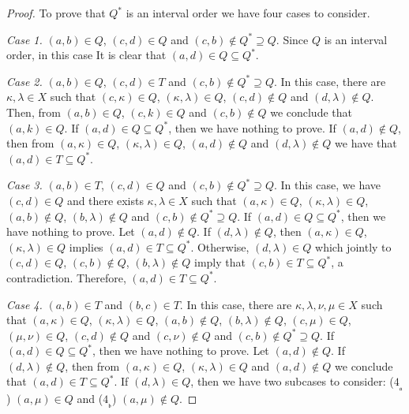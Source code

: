 \documentclass{article}
\theoremstyle{definition}
\begin{document}
\begin{proof}
To prove that $Q^{\ast}$ is an interval order we have four cases to consider.
\par\smallskip\par\noindent
{\it Case 1.} $(a,b)\in Q$, $(c,d)\in Q$ and $(c,b)\notin Q^{\ast}\supseteq Q$.
Since $Q$ is an interval order, in this case It is clear that $(a,d)\in Q\subseteq Q^{\ast}$.
\par\smallskip\par\noindent
{\it Case 2.} $(a,b)\in Q$, $(c,d)\in T$ and $(c,b)\notin Q^{\ast}\supseteq Q$.
In this case, there are $\kappa, \lambda\in X$ such that
$(c,\kappa)\in Q$, $(\kappa,\lambda)\in Q$, $(c,d)\notin Q$ and $(d,\lambda)\notin Q$.
Then, from $(a,b)\in Q$, $(c,k)\in Q$ and $(c,b)\notin Q$ we conclude that $(a,k)\in Q$.
If $(a,d)\in Q\subseteq Q^{\ast}$, then we have nothing to prove. If $(a,d)\notin Q$, then from 
$(a,\kappa)\in Q$, $(\kappa,\lambda)\in Q$, $(a,d)\notin Q$ and $(d,\lambda)\notin Q$ we have that $(a,d)\in T\subseteq Q^{\ast}$.
\par\smallskip\par\noindent
{\it Case 3.} $(a,b)\in T$, $(c,d)\in Q$ and $(c,b)\notin Q^{\ast}\supseteq Q$.
In this case,
we have $(c,d)\in Q$ and 
there exists
$\kappa, \lambda \in X$ such that 
$(a,\kappa)\in Q$, $(\kappa,\lambda)\in Q$, $(a,b)\notin Q$, $(b,\lambda)\notin Q$
and  $(c,b)\notin Q^{\ast}\supseteq Q$.
If $(a,d)\in Q\subseteq Q^{\ast}$, then we have nothing to prove.
Let $(a,d)\notin Q$. If $(d,\lambda)\notin Q$, then 
$(a,\kappa)\in Q$, $(\kappa,\lambda)\in Q$ implies $(a,d)\in T\subseteq Q^{\ast}$.
Otherwise, $(d,\lambda)\in Q$ which jointly to $(c,d)\in Q$, $(c,b)\notin Q$, $(b,\lambda)\notin Q$ imply that $(c,b)\in T\subseteq Q^{\ast}$, a contradiction. Therefore, 
$(a,d)\in T\subseteq Q^{\ast}$.
\par\smallskip\par\noindent
{\it Case 4.} $(a,b)\in T$ and $(b,c)\in T$. In this case, there are $\kappa, \lambda, \nu, \mu\in X$
such that 
$(a,\kappa)\in Q$, $(\kappa,\lambda)\in Q$, $(a,b)\notin Q$, $(b,\lambda)\notin Q$,
$(c,\mu)\in Q$, $(\mu,\nu)\in Q$, $(c,d)\notin Q$ and $(c,\nu)\notin Q$ and $(c,b)\notin Q^{\ast}\supseteq Q$.
If $(a,d)\in Q\subseteq Q^{\ast}$, then we have nothing to prove.
Let $(a,d)\notin Q$. 
If $(d,\lambda)\notin Q$, then from $(a,\kappa)\in Q$, $(\kappa,\lambda)\in Q$ and $(a,d)\notin Q$ we conclude that $(a,d)\in T\subseteq Q^{\ast}$.
If $(d,\lambda)\in Q$, then we have two subcases to consider:
($4_{_{\mathfrak{a}}}$) $(a,\mu)\in Q$ and ($4_{_{\mathfrak{b}}}$) $(a,\mu)\notin Q$.

\end{proof}
\end{document}
